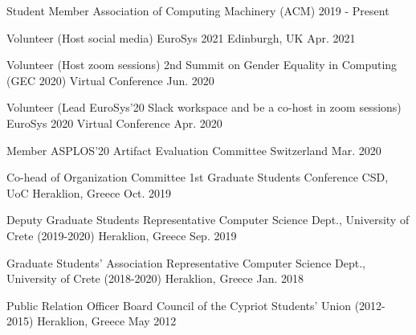 
\begin{cvhonors}

  \cvhonor
    {Student Member} %
    {Association of Computing Machinery (ACM)} %
    {} %
    {2019 - Present} %

  \cvhonor
    {Volunteer (Host social media)} %
    {EuroSys 2021} %
    {Edinburgh, UK} %
    {Apr. 2021} %

  \cvhonor
    {Volunteer (Host zoom sessions)} %
    {2nd Summit on Gender Equality in Computing (GEC 2020)} %
    {Virtual Conference} %
    {Jun. 2020} %


  \cvhonor
    {Volunteer (Lead EuroSys'20 Slack workspace and be a co-host in
    zoom sessions)} %
    {EuroSys 2020} %
    {Virtual Conference} %
    {Apr. 2020} %


  \cvhonor
    {Member} %
    {ASPLOS'20 Artifact Evaluation Committee} %
    {Switzerland} %
    {Mar. 2020} %

  \cvhonor
    {Co-head of Organization Committee} %
    {1st Graduate Students Conference CSD, UoC} %
    {Heraklion, Greece} %
    {Oct. 2019} %

  \cvhonor
    {Deputy Graduate Students Representative} %
    {Computer Science Dept., University of Crete (2019-2020)} %
    {Heraklion, Greece} %
    {Sep. 2019} %

  \cvhonor
    {Graduate Students' Association Representative} %
    {Computer Science Dept., University of Crete (2018-2020)} %
    {Heraklion, Greece} %
    {Jan. 2018} %

  \cvhonor
    {Public Relation Officer} %
    {Board Council of the Cypriot Students' Union (2012-2015)} %
    {Heraklion, Greece} %
    {May 2012} %

\end{cvhonors}
